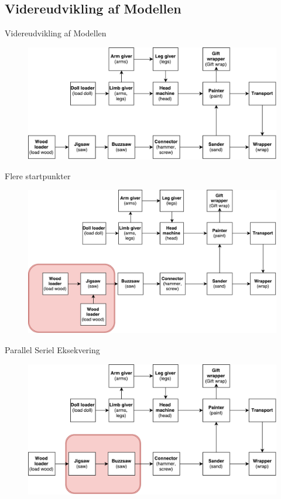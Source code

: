 \subsection{Videreudvikling af Modellen}
\begin{frame}{Videreudvikling af Modellen}{}
    \begin{figure}
    \centering
    \includegraphics[width=1\textwidth]{figures/runningExample.pdf}
  \end{figure}
\end{frame}


\begin{frame}{Flere startpunkter}{}
  \begin{figure}
    \centering
    \includegraphics[width=1\textwidth]{figures/startAt2Modules.pdf}
  \end{figure}
\end{frame}


\begin{frame}{Parallel Seriel Eksekvering}{}
  \begin{figure}
    \centering
    \includegraphics[width=1\textwidth]{figures/serialParallel.pdf}
  \end{figure}
\end{frame}

